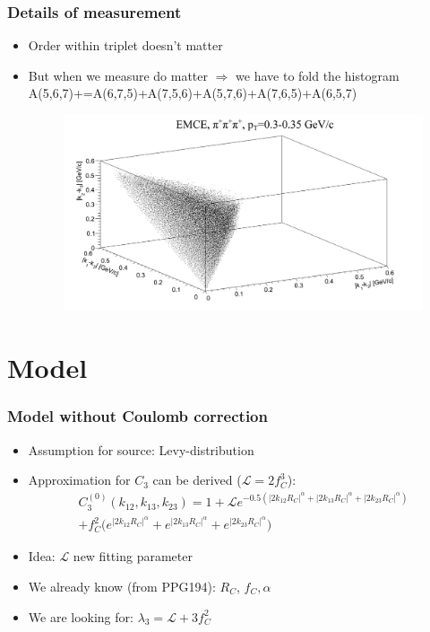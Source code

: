 \documentclass{beamer}
\begin{document}
\begin{frame}
\frametitle{Details of measurement}
\begin{itemize}
\setlength{\itemsep}{16pt}
\item Order within triplet doesn't matter
\item But when we measure do matter $\Rightarrow$ we have to fold the histogram
		\;\;\;A(5,6,7)\;+=\;A(6,7,5)+A(7,5,6)+A(5,7,6)+A(7,6,5)+A(6,5,7)
\begin{figure}
\includegraphics[scale=0.25]{pic/C2}
\end{figure}
\end{itemize}
\end{frame}

\section{Model}
\begin{frame}
\frametitle{Model without Coulomb correction}
\begin{itemize}
\setlength{\itemsep}{16pt}
\item Assumption for source: Levy-distribution
\item Approximation for $C_3$ can be derived ($\mathcal{L}=2f_C^3$):
\begin{align}
C_3^{(0)}(k_{12}, k_{13}, k_{23}) = 1+ \mathcal{L}e^{-0.5(|2k_{12}R_C|^\alpha+|2k_{13}R_C|^\alpha+|2k_{23}R_C|^\alpha)}\nonumber\\
+f_C^2\bigg(e^{|2k_{12}R_C|^\alpha}+e^{|2k_{13}R_C|^\alpha}+e^{|2k_{23}R_C|^\alpha}\bigg)
\end{align}
\item Idea: $\mathcal{L}$ new fitting parameter
\item We already know (from PPG194): $R_C$, $f_C, \alpha$
\item We are looking for: $\lambda_3=\mathcal{L}+3f_C^2$
\end{itemize}
\end{frame}
\end{document}
